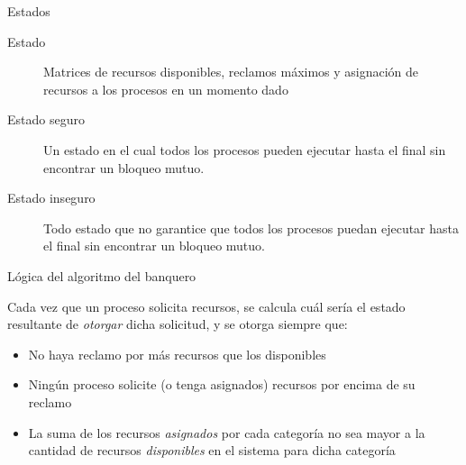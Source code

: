 \documentclass[presentation]{beamer}
\begin{document}
\begin{frame}[label={sec:orgf8102d2}]{Estados}
\begin{description}
\item[{Estado}] Matrices de recursos disponibles, reclamos máximos y
asignación de recursos a los procesos en un momento dado
\item[{Estado seguro}] Un estado en el cual todos los procesos pueden
ejecutar hasta el final sin encontrar un bloqueo
mutuo.
\item[{Estado inseguro}] Todo estado que no garantice que todos los
procesos puedan ejecutar hasta el final sin encontrar un bloqueo
mutuo.
\end{description}
\end{frame}

\begin{frame}[label={sec:org98c68db}]{Lógica del algoritmo del banquero}
\begin{center}
Cada vez que un proceso solicita recursos, se calcula cuál sería el
estado resultante de \emph{otorgar} dicha solicitud, y se otorga siempre
que:
\end{center}

\begin{itemize}
\item No haya reclamo por más recursos que los disponibles

\item Ningún proceso solicite (o tenga asignados) recursos por encima de
su reclamo

\item La suma de los recursos \emph{asignados} por cada categoría no sea mayor
a la cantidad de recursos \emph{disponibles} en el sistema para dicha
categoría
\end{itemize}
\end{frame}
\end{document}
